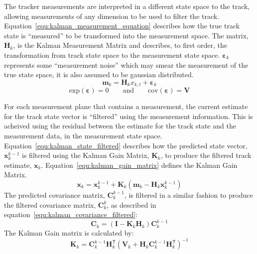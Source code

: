      The tracker measurements are interpreted in a different state space to the track, allowing measurements of any dimension to be used to filter the track. Equation~\ref{equ:kalman_measurement_equation} describes how the true track state is ``measured'' to be transformed into the measurement space. The matrix, $\mathbf{H}_k$, is the Kalman Measurement Matrix and describes, to first order, the transformation from track state space to the measurement state space. $\mathbf{\varepsilon}_k$ represents some ``measurement noise'' which may smear the measurement of the true state space, it is also assumed to be gaussian distributed.
    \begin{equation}
      \mathbf{m}_k = \mathbf{H}_kx_{k,t} + \mathbf{\varepsilon}_k
      \label{equ:kalman_measurement_equation}
    \end{equation}
    \begin{equation*}
      \textrm{exp}(\mathbf{\varepsilon}) = 0 \quad\quad \textrm{and} \quad\quad \textrm{cov}(\mathbf{\varepsilon}) = \mathbf{V}
    \end{equation*}

    For each measurement plane that contains a measurement, the current estimate for the track state vector is ``filtered'' using the measurement information. This is acheived using the residual between the estimate for the track state and the measurement data, in the measurement state space. Equation~\ref{equ:kalman_state_filtered} describes how the predicted state vector, $\mathbf{x}_{k}^{k-1}$ is filtered using the Kalman Gain Matrix, $\mathbf{K}_k$, to produce the filtered track estimate, $\mathbf{x}_k$. Equation~\ref{equ:kalman_gain_matrix} defines the Kalman Gain Matrix.
    \begin{equation}
      \mathbf{x}_k = \mathbf{x}_k^{k-1} + \mathbf{K}_k ( \mathbf{m}_k - \mathbf{H}_k \mathbf{x}_k^{k-1} )
      \label{equ:kalman_state_filtered}
    \end{equation}
    The predicted covariance matrix, $\mathbf{C}_k^{k-1}$, is filtered in a similar  fashion to produce the filtered covariance matrix, $\mathbf{C}_k^{k}$, as described in equation~\ref{equ:kalman_covariance_filtered}:
    \begin{equation}
      \mathbf{C}_k = ( \mathbf{I} - \mathbf{K}_k \mathbf{H}_k ) \mathbf{C}_k^{k-1}
      \label{equ:kalman_covariance_filtered}
    \end{equation}
    The Kalman Gain matrix is calculated by:
    \begin{equation}
      \mathbf{K}_k = \mathbf{C}_k^{k-1} \mathbf{H}_k^\mathsf{T} (\mathbf{V}_k + \mathbf{H}_k \mathbf{C}_k^{k-1} \mathbf{H}_k^\mathsf{T})^{-1}
      \label{equ:kalman_gain_matrix}
    \end{equation}

